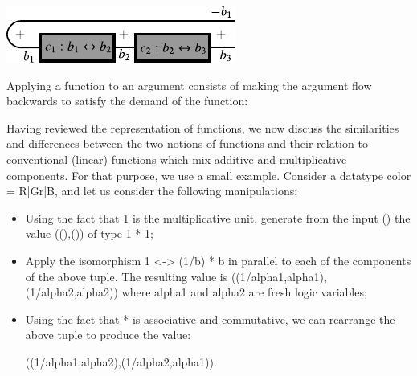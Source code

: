 \documentclass[preprint]{sigplanconf}
\begin{document}
\begin{center}
  \includegraphics{diagrams/compose2.pdf}
\end{center}

Applying a function to an argument consists of making the argument flow
backwards to satisfy the demand of the function:
\begin{multicols}{2}
\begin{center}
\end{center}
\begin{center}
\end{center}
\end{multicols}

Having reviewed the representation of functions, we now discuss the
similarities and differences between the two notions of functions and their
relation to conventional (linear) functions which mix additive and
multiplicative components. For that purpose, we use a small example.
Consider a datatype {{color = R|Gr|B}}, and let us consider the following
manipulations:
\begin{itemize}
\item Using the fact that {{1}} is the multiplicative unit, generate
  from the input {{()}} the value {{((),())}} of type {{1 * 1}};
\item Apply the isomorphism {{1 <-> (1/b) * b}} in parallel to each of
  the components of the above tuple. The resulting value is
  {{((1/alpha1,alpha1),(1/alpha2,alpha2))}} where {{alpha1}} and
  {{alpha2}} are fresh logic variables;
\item Using the fact that {{*}} is associative and commutative, we can
  rearrange the above tuple to produce the value:

{{((1/alpha1,alpha2),(1/alpha2,alpha1))}}.

\end{itemize}
\end{document}
